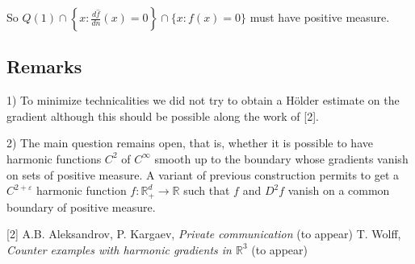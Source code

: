 \documentclass[11pt,reqno]{amsart}
\newcommand{\Rd}{\mathbb{R}^d_+}
\newcommand{\dn}[1]{\frac{d#1}{dn}}
\newcommand{\he}[1]{\widehat{#1}}          %
\begin{document}
So $Q(1)\cap\left\{x:\dn{\he{f}}(x)=0\right\}\cap\{x:f(x)=0\}$ must have positive
measure.

\subsection*{Remarks}

1) To minimize technicalities we did not try to obtain a H\"older estimate on the
gradient although this should be possible along the work of [2].

2) The main question remains open, that is, whether it is possible to have
harmonic functions $C^2$ of $C^\infty$ smooth up to the boundary whose gradients
vanish on sets of positive measure.  A variant of previous construction permits to
get a $C^{2+\varepsilon}$ harmonic function $f:\Rd\to\mathbb{R}$ such that $f$ and
$D^2 f$ vanish on a common boundary of positive measure.

\begin{thebibliography}{[2]}
 A.B. Aleksandrov, P. Kargaev, \emph{Private communication} (to appear)
  T. Wolff, \emph{Counter examples with harmonic gradients in
  $\mathbb{R}^3$} (to appear)
\end{thebibliography}
\end{document}
